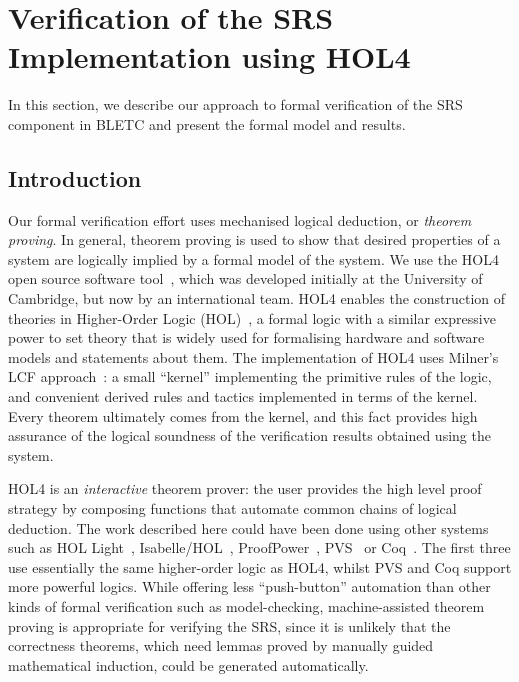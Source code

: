 \documentclass{llncs}
\begin{document}
\section{Verification of the SRS Implementation using HOL4}
\label{sec-verification}

In this section, we describe our approach to formal verification of the SRS component in BLETC and present the formal model and results.

\subsection{Introduction}
Our formal verification effort uses mechanised logical deduction, or \emph{theorem proving}.
In general, theorem proving is used to show that desired properties of a system are logically implied by a formal model of the system.
We use the HOL4 open source software tool~\cite{HOL4,DBLP:conf/tphol/SlindN08}, which was developed initially at the University of Cambridge, but now by an international team.
HOL4 enables the construction of theories in Higher-Order Logic (HOL)~\cite{DBLP:journals/jsyml/Church40}, a formal logic with a similar expressive power to set theory that is widely used for formalising hardware and software models and statements about them.
The implementation of HOL4 uses Milner's LCF approach~\cite{Milner:1972:LCF:891954}: a small ``kernel'' implementing the primitive rules of the logic, and convenient derived rules and tactics implemented in terms of the kernel.
Every theorem ultimately comes from the kernel, and this fact provides high assurance of the logical soundness of the verification results obtained using the system.

HOL4 is an \emph{interactive} theorem prover: the user provides the high level proof strategy by composing functions that automate common chains of logical deduction.
The work described here could have been done using other systems such as HOL Light~\cite{HOLLight,DBLP:conf/tphol/Harrison09a}, Isabelle/HOL~\cite{Isabelle}, ProofPower~\cite{ProofPower}, PVS~\cite{PVS,DBLP:conf/tphol/OwreS08} or Coq~\cite{Coq}.
The first three use essentially the same higher-order logic as HOL4, whilst PVS and Coq support more powerful logics.
While offering less ``push-button'' automation than other kinds of formal verification such as model-checking, machine-assisted theorem proving is appropriate for verifying the SRS, since it is unlikely that the correctness theorems, which need lemmas proved by manually guided mathematical induction, could be generated automatically.
\end{document}

